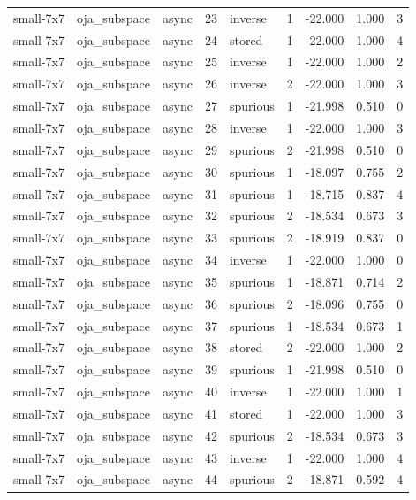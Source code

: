 \begin{tabular}{lllrlrrrr}
small-7x7 & oja\_subspace & async & 23 & inverse & 1 & -22.000 & 1.000 & 3 \\
small-7x7 & oja\_subspace & async & 24 & stored & 1 & -22.000 & 1.000 & 4 \\
small-7x7 & oja\_subspace & async & 25 & inverse & 1 & -22.000 & 1.000 & 2 \\
small-7x7 & oja\_subspace & async & 26 & inverse & 2 & -22.000 & 1.000 & 3 \\
small-7x7 & oja\_subspace & async & 27 & spurious & 1 & -21.998 & 0.510 & 0 \\
small-7x7 & oja\_subspace & async & 28 & inverse & 1 & -22.000 & 1.000 & 3 \\
small-7x7 & oja\_subspace & async & 29 & spurious & 2 & -21.998 & 0.510 & 0 \\
small-7x7 & oja\_subspace & async & 30 & spurious & 1 & -18.097 & 0.755 & 2 \\
small-7x7 & oja\_subspace & async & 31 & spurious & 1 & -18.715 & 0.837 & 4 \\
small-7x7 & oja\_subspace & async & 32 & spurious & 2 & -18.534 & 0.673 & 3 \\
small-7x7 & oja\_subspace & async & 33 & spurious & 2 & -18.919 & 0.837 & 0 \\
small-7x7 & oja\_subspace & async & 34 & inverse & 1 & -22.000 & 1.000 & 0 \\
small-7x7 & oja\_subspace & async & 35 & spurious & 1 & -18.871 & 0.714 & 2 \\
small-7x7 & oja\_subspace & async & 36 & spurious & 2 & -18.096 & 0.755 & 0 \\
small-7x7 & oja\_subspace & async & 37 & spurious & 1 & -18.534 & 0.673 & 1 \\
small-7x7 & oja\_subspace & async & 38 & stored & 2 & -22.000 & 1.000 & 2 \\
small-7x7 & oja\_subspace & async & 39 & spurious & 1 & -21.998 & 0.510 & 0 \\
small-7x7 & oja\_subspace & async & 40 & inverse & 1 & -22.000 & 1.000 & 1 \\
small-7x7 & oja\_subspace & async & 41 & stored & 1 & -22.000 & 1.000 & 3 \\
small-7x7 & oja\_subspace & async & 42 & spurious & 2 & -18.534 & 0.673 & 3 \\
small-7x7 & oja\_subspace & async & 43 & inverse & 1 & -22.000 & 1.000 & 4 \\
small-7x7 & oja\_subspace & async & 44 & spurious & 2 & -18.871 & 0.592 & 4 \\

\end{tabular}
